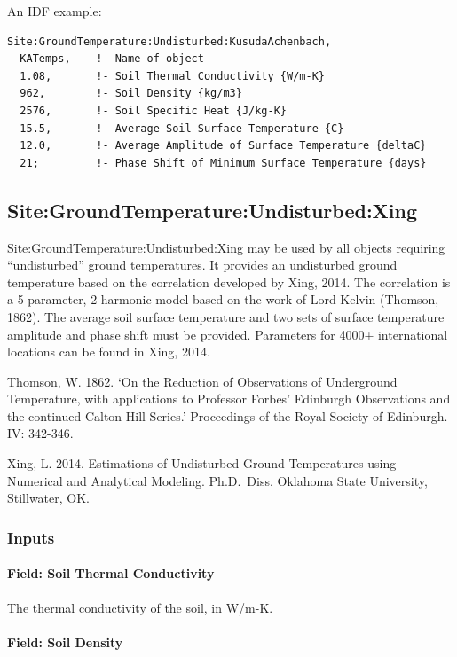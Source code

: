An IDF example:

\begin{lstlisting}
Site:GroundTemperature:Undisturbed:KusudaAchenbach,
  KATemps,    !- Name of object
  1.08,       !- Soil Thermal Conductivity {W/m-K}
  962,        !- Soil Density {kg/m3}
  2576,       !- Soil Specific Heat {J/kg-K}
  15.5,       !- Average Soil Surface Temperature {C}
  12.0,       !- Average Amplitude of Surface Temperature {deltaC}
  21;         !- Phase Shift of Minimum Surface Temperature {days}
\end{lstlisting}

\subsection{Site:GroundTemperature:Undisturbed:Xing}\label{sitegroundtemperatureundisturbedxing}

Site:GroundTemperature:Undisturbed:Xing may be used by all objects requiring ``undisturbed'' ground temperatures. It provides an undisturbed ground temperature based on the correlation developed by Xing, 2014. The correlation is a 5 parameter, 2 harmonic model based on the work of Lord Kelvin (Thomson, 1862). The average soil surface temperature and two sets of surface temperature amplitude and phase shift must be provided. Parameters for 4000+ international locations can be found in Xing, 2014.

Thomson, W. 1862. `On the Reduction of Observations of Underground Temperature, with applications to Professor Forbes' Edinburgh Observations and the continued Calton Hill Series.' Proceedings of the Royal Society of Edinburgh. IV: 342-346.

Xing, L. 2014. Estimations of Undisturbed Ground Temperatures using Numerical and Analytical Modeling. Ph.D.~Diss. Oklahoma State University, Stillwater, OK.

\subsubsection{Inputs}\label{inputs-15-007}

\paragraph{Field: Soil Thermal Conductivity}\label{field-soil-thermal-conductivity-2}

The thermal conductivity of the soil, in W/m-K.

\paragraph{Field: Soil Density}\label{field-soil-density-2}

